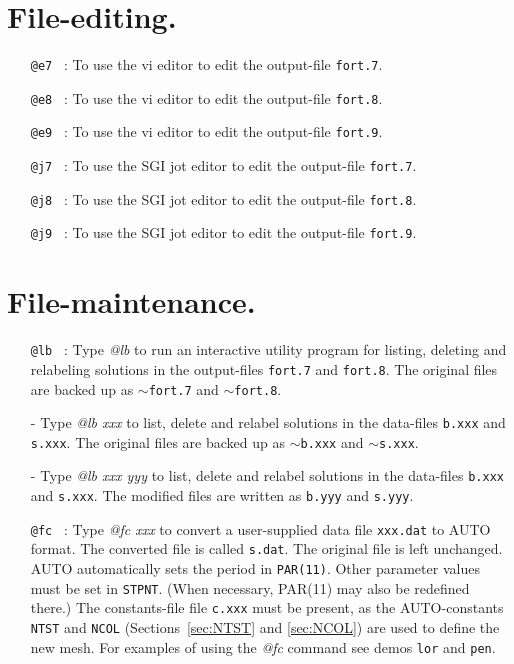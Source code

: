 \documentclass[12pt]{report}
\begin{document}
\section{ File-editing.} 

\begin{itemize}

\item[\tt @e7]~:
  To use the vi editor to edit the output-file {\tt fort.7}.
\item[\tt @e8]~:
  To use the vi editor to edit the output-file {\tt fort.8}.
\item[\tt @e9]~:
  To use the vi editor to edit the output-file {\tt fort.9}.
\item[\tt @j7]~:
  To use the SGI jot editor to edit the output-file {\tt fort.7}.
\item[\tt @j8]~:
  To use the SGI jot editor to edit the output-file {\tt fort.8}.
\item[\tt @j9]~:
  To use the SGI jot editor to edit the output-file {\tt fort.9}.
  
\end{itemize}

\section{ File-maintenance.} 

\begin{itemize}
\item[\tt @lb]~:
  Type {\it @lb} to run an interactive utility program
  for listing, deleting and relabeling solutions 
  in the output-files {\tt fort.7} and {\tt fort.8}.
  The original files are backed up as
{\tt $\sim$fort.7} and {\tt $\sim$fort.8}. 
  \item[-]
  Type {\it @lb xxx} to list, delete and relabel solutions
  in the data-files {\tt b.xxx} and {\tt s.xxx}.
  The original files are backed up as {\tt $\sim$b.xxx} and {\tt $\sim$s.xxx}. 
\item[-]
  Type {\it @lb xxx yyy} to list, delete and relabel solutions
  in the data-files {\tt b.xxx} and {\tt s.xxx}.
  The modified files are written as {\tt b.yyy} and {\tt s.yyy}. 

\item[\tt @fc]~:
  Type {\it @fc xxx} to convert a user-supplied data file {\tt xxx.dat}
  to {\cal AUTO} format. The converted file is called {\tt s.dat}.
  The original file is left unchanged.
  {\cal AUTO} automatically sets the period in {\tt PAR(11)}.
  Other parameter values must be set in {\tt STPNT}. (When necessary,
  PAR(11) may also be redefined there.) 
  The constants-file file {\tt c.xxx} must be present, as the 
  {\cal AUTO}-constants {\tt NTST} and {\tt NCOL} 
  (Sections~\ref{sec:NTST} and \ref{sec:NCOL}) are used to define the new mesh.
  For examples of using the {\it @fc} command see demos {\tt lor} and {\tt pen}.

\end{itemize}
\end{document}
